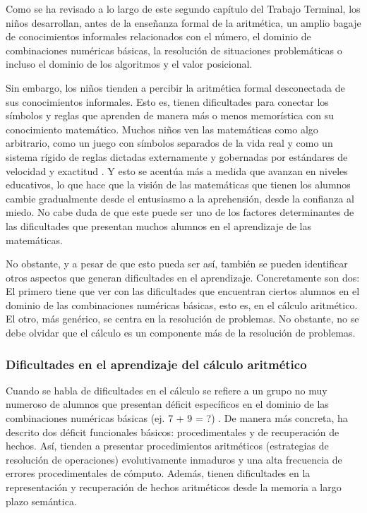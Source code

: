 \documentclass{article}
\begin{document}
Como se ha revisado a lo largo de este segundo capítulo del Trabajo Terminal, los niños desarrollan, antes de la enseñanza formal de la aritmética, un amplio bagaje de conocimientos informales relacionados con el número, el dominio de combinaciones numéricas básicas, la resolución de situaciones problemáticas o incluso el dominio de los algoritmos y el valor posicional.

Sin embargo, los niños tienden a percibir la aritmética formal desconectada de sus conocimientos informales. Esto es, tienen dificultades para conectar los símbolos y reglas que aprenden de manera más o menos memorística con su conocimiento matemático. Muchos niños ven las matemáticas como algo arbitrario, como un juego con símbolos separados de la vida real y como un sistema rígido de reglas dictadas externamente y gobernadas por estándares de velocidad y exactitud \cite{orrantia2002dificultades}. Y esto se acentúa más a medida que avanzan en niveles educativos, lo que hace que la visión de las matemáticas que tienen los alumnos cambie gradualmente desde el entusiasmo a la aprehensión, desde la confianza al miedo. No cabe duda de que este puede ser uno de los factores determinantes de las dificultades que presentan muchos alumnos en el aprendizaje de las matemáticas.

No obstante, y a pesar de que esto pueda ser así, también se pueden identificar otros aspectos que generan dificultades en el aprendizaje. Concretamente son dos: El primero tiene que ver con las dificultades que encuentran ciertos alumnos en el dominio de las combinaciones numéricas básicas, esto es, en el cálculo aritmético. El otro, más genérico, se centra en la resolución de problemas. No obstante, no se debe olvidar que el cálculo es un componente más de la resolución de problemas.

\subsubsection{Dificultades en el aprendizaje del cálculo aritmético} 
Cuando se habla de dificultades en el cálculo se refiere a un grupo no muy numeroso de alumnos que presentan déficit específicos en el dominio de las combinaciones numéricas básicas (ej. 7 + 9 = ?) \cite{riley1984development}. De manera más concreta, ha descrito dos déficit funcionales básicos: procedimentales y de recuperación de hechos. Así, tienden a presentar procedimientos aritméticos (estrategias de resolución de operaciones) evolutivamente inmaduros y una alta frecuencia de errores procedimentales de cómputo. Además, tienen dificultades en la representación y recuperación de hechos aritméticos desde la memoria a largo plazo semántica.
\end{document}
